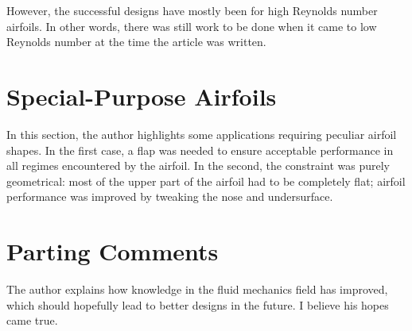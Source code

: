 However, the successful designs have mostly been for high Reynolds number airfoils. In other words, there was still
work to be done when it came to low Reynolds number at the time the article was written.

\section{Special-Purpose Airfoils}
In this section, the author highlights some applications requiring peculiar airfoil shapes. In the first case, a
flap was needed to ensure acceptable performance in all regimes encountered by the airfoil. In the second, the constraint
was purely geometrical: most of the upper part of the airfoil had to be completely flat; airfoil performance
was improved by tweaking the nose and undersurface.

\section{Parting Comments}
The author explains how knowledge in the fluid mechanics field has improved, which should hopefully lead to
better designs in the future. I believe his hopes came true.
\label{sec:Parting Comments}

